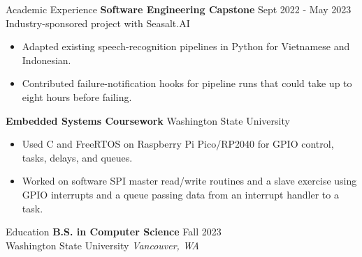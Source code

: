\documentclass{resume}
\begin{document}
\begin{rSection}{Academic Experience}
\textbf{Software Engineering Capstone} \hfill Sept 2022 - May 2023 \\
Industry-sponsored project with Seasalt.AI
\begin{itemize}\itemsep -3pt
\item Adapted existing speech-recognition pipelines in Python for Vietnamese and Indonesian.
\item Contributed failure-notification hooks for pipeline runs that could take up to eight hours before failing.
\end{itemize}

\textbf{Embedded Systems Coursework} \hfill Washington State University
\begin{itemize}\itemsep -3pt
\item Used C and FreeRTOS on Raspberry Pi Pico/RP2040 for GPIO control, tasks, delays, and queues.
\item Worked on software SPI master read/write routines and a slave exercise using GPIO interrupts and a queue passing data from an interrupt handler to a task.
\end{itemize}
\end{rSection}

\begin{rSection}{Education}
\textbf{B.S. in Computer Science} \hfill Fall 2023 \\
Washington State University \hfill \textit{Vancouver, WA}
\end{rSection}
\end{document}
